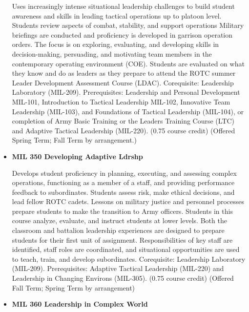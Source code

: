 \documentclass[
  letterpaper,
]{scrbook}
\begin{document}
\begin{itemize}
  Uses increasingly intense situational leadership challenges to build
  student awareness and skills in leading tactical operations up to
  platoon level. Students review aspects of combat, stability, and
  support operations Military briefings are conducted and proficiency is
  developed in garrison operation orders. The focus is on exploring,
  evaluating, and developing skills in decision-making, persuading, and
  motivating team members in the contemporary operating environment
  (COE). Students are evaluated on what they know and do as leaders as
  they prepare to attend the ROTC summer Leader Development Assessment
  Course (LDAC). Corequisite: Leadership Laboratory (MIL-209).
  Prerequisites: Leadership and Personal Development MIL-101,
  Introduction to Tactical Leadership MIL-102, Innovative Team
  Leadership (MIL-103), and Foundations of Tactical Leadership
  (MIL-104), or completion of Army Basic Training or the Leaders
  Training Course (LTC) and Adaptive Tactical Leadership (MIL-220).
  (0.75 course credit) (Offered Spring Term; Fall Term by arrangement.)
\item
  \textbf{MIL 350 Developing Adaptive Ldrshp}

  Develops student proficiency in planning, executing, and assessing
  complex operations, functioning as a member of a staff, and providing
  performance feedback to subordinates. Students assess risk, make
  ethical decisions, and lead fellow ROTC cadets. Lessons on military
  justice and personnel processes prepare students to make the
  transition to Army officers. Students in this course analyze,
  evaluate, and instruct students at lower levels. Both the classroom
  and battalion leadership experiences are designed to prepare students
  for their first unit of assignment. Responsibilities of key staff are
  identified, staff roles are coordinated, and situational opportunities
  are used to teach, train, and develop subordinates. Corequisite:
  Leadership Laboratory (MIL-209). Prerequisites: Adaptive Tactical
  Leadership (MIL-220) and Leadership in Changing Environs (MIL-305).
  (0.75 course credit) (Offered Fall Term; Spring Term by arrangement)
\item
  \textbf{MIL 360 Leadership in Complex World}


\end{itemize}
\end{document}
